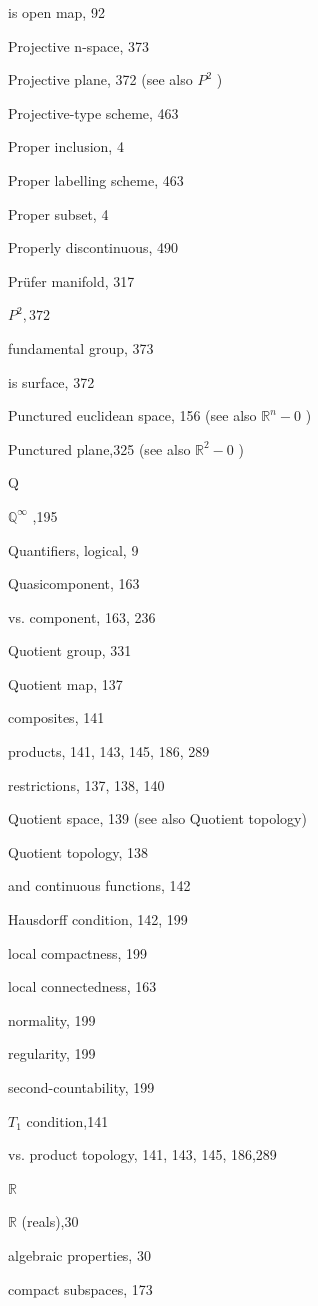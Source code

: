 is open map, 92

Projective n-space, 373

Projective plane, 372 (see also \({P}^{2}\) )

Projective-type scheme, 463

Proper inclusion, 4

Proper labelling scheme, 463

Proper subset, 4

Properly discontinuous, 490

Prüfer manifold, 317

\({P}^{2},{372}\)

fundamental group, 373

is surface, 372

Punctured euclidean space, 156 (see also \({\mathbb{R}}^{n} - 0\) )

Punctured plane,325 (see also \({\mathbb{R}}^{2} - 0\) )

Q

\({\mathbb{Q}}^{\infty }\) ,195

Quantifiers, logical, 9

Quasicomponent, 163

vs. component, 163, 236

Quotient group, 331

Quotient map, 137

composites, 141

products, 141, 143, 145, 186, 289

restrictions, 137, 138, 140

Quotient space, 139 (see also Quotient topology)

Quotient topology, 138

and continuous functions, 142

Hausdorff condition, 142, 199

local compactness, 199

local connectedness, 163

normality, 199

regularity, 199

second-countability, 199

\({T}_{1}\) condition,141

vs. product topology, 141, 143, 145, 186,289

\(\mathbb{R}\)

\(\mathbb{R}\) (reals),30

algebraic properties, 30

compact subspaces, 173

